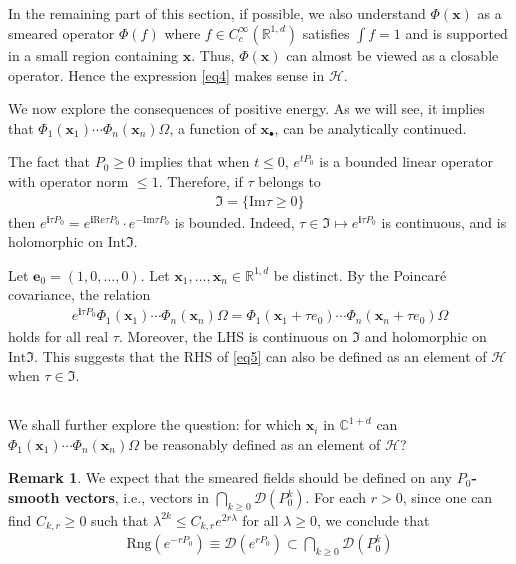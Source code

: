 \documentclass[12pt,b5paper,notitlepage]{article}
\theoremstyle{definition}
\newtheorem{rem}[df]{Remark}
\theoremstyle{plain}
\newcommand{\fk}{\mathfrak}
\newcommand{\mc}{\mathcal}
\newcommand{\Dom}{\scr{D}}
\newcommand{\scr}{\mathscr}
\newcommand{\im}{\mathbf{i}}
\newcommand{\mbf}{\mathbf}
\newcommand{\blt}{\bullet}
\newcommand{\Cbb}{\mathbb C}
\newcommand{\Rbb}{\mathbb R}
\newcommand{\Rng}{\mathrm{Rng}}
\newcommand{\Real}{\mathrm{Re}}
\newcommand{\Imag}{\mathrm{Im}}
\newcommand{\Int}{\mathrm{Int}}
\newcommand{\xbf}{\mathbf x}
\numberwithin{equation}{section}
\begin{document}
\subsection{}

In the remaining part of this section,  if possible, we also understand $\Phi(\xbf)$ as a smeared operator $\Phi(f)$ where $f\in C_c^\infty(\Rbb^{1,d})$ satisfies $\int f=1$ and is supported in a small region containing $\xbf$. Thus, $\Phi(\xbf)$ can almost be viewed as a closable operator. Hence the expression \eqref{eq4} makes sense in $\mc H$.


We now explore the consequences of positive energy. As we will see, it implies that $\Phi_1(\xbf_1)\cdots\Phi_n(\xbf_n)\Omega$, a function of $\xbf_\blt$, can be analytically continued.

The fact that $P_0\geq0$ implies that when $t\leq0$, $e^{tP_0}$ is a bounded linear operator with operator norm $\leq1$. Therefore, if $\tau$ belongs to
\begin{align*}
\fk I=\{\Imag\tau\geq0\}
\end{align*}
then $e^{\im \tau P_0}=e^{\im \Real\tau P_0}\cdot e^{-\Imag\tau P_0}$ is bounded. Indeed, $\tau\in\fk I\mapsto e^{\im\tau P_0}$ is continuous, and is holomorphic on $\Int\fk I$. 

Let $\mbf e_0=(1,0,\dots,0)$. Let $\xbf_1,\dots,\xbf_n\in\Rbb^{1,d}$ be distinct. By the Poincar\'e covariance, the relation
\begin{align}\label{eq5}
e^{\im\tau P_0}\Phi_1(\xbf_1)\cdots\Phi_n(\xbf_n)\Omega=\Phi_1(\xbf_1+\tau e_0)\cdots\Phi_n(\xbf_n+\tau e_0)\Omega
\end{align}
holds for all real $\tau$. Moreover, the LHS is continuous on $\fk I$ and holomorphic on $\Int\fk I$. This suggests that the RHS of \eqref{eq5} can also be defined as an element of $\mc H$ when $\tau\in\fk I$. 


\subsection{}\label{lb3}


We shall further explore the question: for which $\xbf_i$ in $\Cbb^{1+d}$ can $\Phi_1(\xbf_1)\cdots\Phi_n(\xbf_n)\Omega$ be reasonably defined as an element of $\mc H$? 

\begin{rem}
We expect that the smeared fields should be defined on any \textbf{$P_0$-smooth vectors}, i.e., vectors in $\bigcap_{k\geq0}\Dom(P_0^k)$. For each $r>0$, since one can find $C_{k,r}\geq0$ such that $\lambda^{2k}\leq C_{k,r}e^{2r\lambda}$ for all $\lambda\geq0$, we conclude that
\begin{align}
\Rng(e^{-rP_0})\equiv \Dom(e^{rP_0})\subset \bigcap_{k\geq0}\Dom(P_0^k)
\end{align}
\end{rem}
\end{document}
